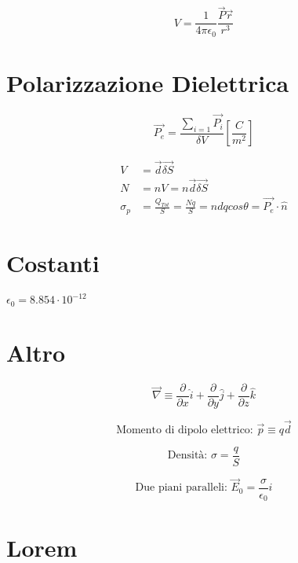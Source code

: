 \documentclass[a4paper,11pt]{article}
\begin{document}
\begin{multicols}{3}
		\begin{equation}
			V = \frac{1}{4 \pi \epsilon_0} \frac{\vec{P}\vec{r}}{r^3}
		\end{equation}
	
		\section{Polarizzazione Dielettrica}
		\begin{equation}
			\vec{P_e} = \frac{\sum_{i=1}\vec{P_i}}{\delta V} \left[\frac{C}{m^2}\right]
		\end{equation}
	
		\begin{align*}
			V &= \vec{d} \vec{\delta S} \\
			N &= nV = n\vec{d} \vec{\delta S} \\
			\sigma_p &= \frac{Q_{Tot}}{S} = \frac{Nq}{S} = ndqcos\theta = \vec{P_e} \cdot \hat{n}
		\end{align*}
	
	
	
	
	
	
	
	
	
	
		
		
		\section{Costanti}
		$\epsilon_{0}=8.854 \cdot 10^{-12}$
		
		
		
		\section{Altro}
		
		\begin{equation}
			\vec{\nabla} \equiv
			\frac{\partial}{\partial x}\hat{i} +
			\frac{\partial}{\partial y}\hat{j} +
			\frac{\partial}{\partial z}\hat{k}
		\end{equation}
		
		\begin{equation}
			\text{Momento di dipolo elettrico: }\vec{p} \equiv q \vec{d}
		\end{equation}
		
		\begin{equation}
			\text{Densità: } \sigma = \frac{q}{S}
		\end{equation}
		
		\begin{equation}
			\text{Due piani paralleli: }\vec{E}_0 = \frac{\sigma}{\epsilon_0} \hat{i}
		\end{equation}
		
		
		
		
		
		\section{Lorem}
		\lipsum[1-10]
	\end{multicols}
	
\end{document}

